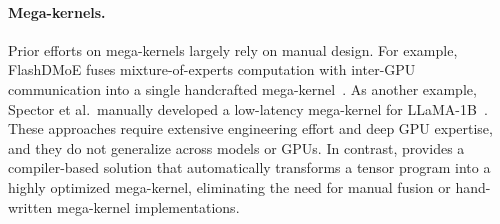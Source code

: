 
\paragraph{Mega-kernels.}
Prior efforts on mega-kernels largely rely on manual design. For example, FlashDMoE fuses mixture-of-experts computation with inter-GPU communication into a single handcrafted mega-kernel~\cite{aimuyo2025flashdmoe}. As another example, Spector et al.\ manually developed a low-latency mega-kernel for LLaMA-1B~\cite{touvron2023llama, megakernel}.
These approaches require extensive engineering effort and deep GPU expertise, and they do not generalize across models or GPUs.
In contrast, \sys provides a compiler-based solution that automatically transforms a tensor program into a highly optimized mega-kernel, eliminating the need for manual fusion or hand-written mega-kernel implementations.

%
